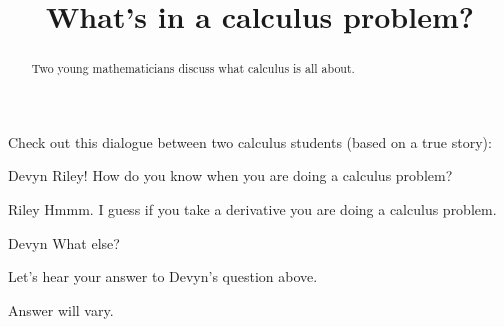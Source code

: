 \documentclass{ximera}
\title[Break-Ground:]{What's in a calculus problem?}
\begin{document}
\begin{abstract}
Two young mathematicians discuss what calculus is all about.
\end{abstract}
\maketitle


Check out this dialogue between two calculus students (based on a true
story):

\begin{dialogue}
\item[Devyn] Riley! How do you know when you are doing a calculus problem?
\item[Riley] Hmmm. I guess if you take a derivative you are doing a calculus problem.
\item[Devyn] What else?
\end{dialogue}

\begin{problem}
  Let's hear your answer to Devyn's question above.
  \begin{freeResponse}
    Answer will vary.
  \end{freeResponse}
\end{problem}



%
\end{document}
